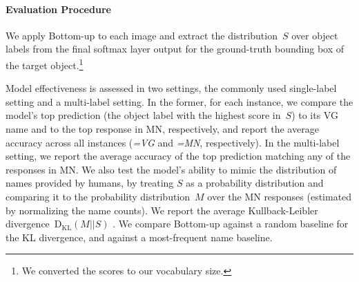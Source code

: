 \paragraph{Evaluation Procedure}
We apply Bottom-up to each image and extract the distribution~$S$ over object labels from the final softmax layer output for the ground-truth bounding box of the target object.\footnote{We converted the scores to our vocabulary size.} 

Model effectiveness is assessed in two settings, the commonly used single-label setting and a multi-label setting. 
In the former, for each instance, we compare the model's top prediction (the object label with the highest score in\ $S$) to its VG name and to the top response in MN, respectively, and report the average accuracy across all instances (\textit{=VG} and \textit{=MN}, respectively).
In the multi-label setting, we report the average accuracy of the top prediction matching any of the responses in MN.
We also test the model's ability to mimic the distribution of names provided by humans, by treating $S$ as a probability distribution and comparing it to the probability distribution~$M$ over the MN responses (estimated by normalizing the name counts). 
We report the average Kullback-Leibler divergence~$\mathrm{D_{KL}}(M||S)$ \cite{kullback1951information}.
We compare Bottom-up against a random baseline for the KL divergence, and against a most-frequent name baseline. 
%
\iffalse
\textsl{top}: the model's top prediction
\begin{itemize}
	\item \textbf{=VG} The average model accuracy of \textsl{top} on the VG names
	\item \textbf{=MN} The average model accuracy of \textsl{top} on the top response in ManyNames
	\item \textbf{$\in$MN} The average model accuracy of \textsl{top} to match any name of the responses in ManyNames
	\item \textbf{KL} The average Kullback-Leibler divergence~$\mathrm{D_{KL}}(M||S)$ of the model's softmax output~$S$ and the  probability distribution~$M$ over ManyNames, estimated by normalizing the name counts per instance
\end{itemize}
\fi

